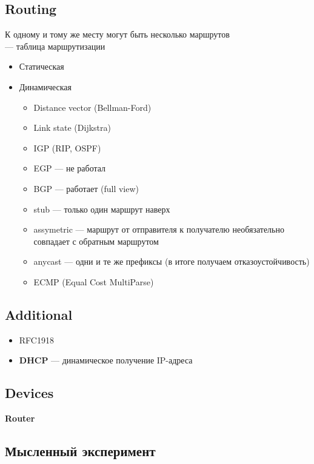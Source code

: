\documentclass[../../lectures.tex]{subfiles}
\begin{document}
\subsection{Routing}
К одному и тому же месту могут быть несколько маршрутов\\
 --- таблица маршрутизации\\
\begin{itemize}
    \item Статическая
    \item Динамическая
        \begin{itemize}
            \item Distance vector (Bellman-Ford)
            \item Link state (Dijkstra)
            \item IGP (RIP, OSPF)
            \item EGP --- не работал
            \item BGP --- работает (full view)
            \item stub --- только один маршрут наверх
            \item assymetric --- маршрут от отправителя к получателю необязательно совпадает с обратным маршрутом
            \item anycast --- одни и те же префиксы (в итоге получаем отказоустойчивость)
            \item ECMP (Equal Cost MultiParse)
        \end{itemize}
\end{itemize}

\subsection{Additional}
\begin{itemize}
    \item RFC1918
    \item \textbf{DHCP} --- динамическое получение IP-адреса
\end{itemize}

\subsection{Devices}
\textbf{Router}

\subsection{Мысленный эксперимент}
\end{document}
